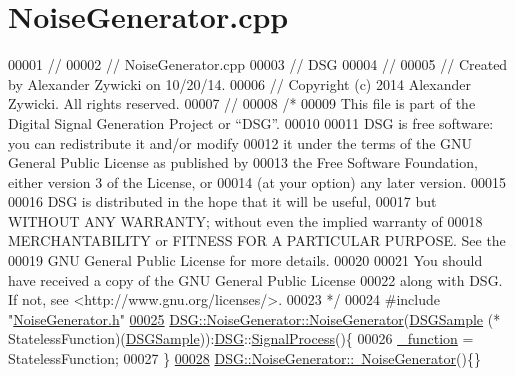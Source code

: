 \hypertarget{_noise_generator_8cpp_source}{\section{Noise\+Generator.\+cpp}
\label{_noise_generator_8cpp_source}
}

\begin{DoxyCode}
00001 \textcolor{comment}{//}
00002 \textcolor{comment}{//  NoiseGenerator.cpp}
00003 \textcolor{comment}{//  DSG}
00004 \textcolor{comment}{//}
00005 \textcolor{comment}{//  Created by Alexander Zywicki on 10/20/14.}
00006 \textcolor{comment}{//  Copyright (c) 2014 Alexander Zywicki. All rights reserved.}
00007 \textcolor{comment}{//}
00008 \textcolor{comment}{/*}
00009 \textcolor{comment}{ This file is part of the Digital Signal Generation Project or “DSG”.}
00010 \textcolor{comment}{}
00011 \textcolor{comment}{ DSG is free software: you can redistribute it and/or modify}
00012 \textcolor{comment}{ it under the terms of the GNU General Public License as published by}
00013 \textcolor{comment}{ the Free Software Foundation, either version 3 of the License, or}
00014 \textcolor{comment}{ (at your option) any later version.}
00015 \textcolor{comment}{}
00016 \textcolor{comment}{ DSG is distributed in the hope that it will be useful,}
00017 \textcolor{comment}{ but WITHOUT ANY WARRANTY; without even the implied warranty of}
00018 \textcolor{comment}{ MERCHANTABILITY or FITNESS FOR A PARTICULAR PURPOSE.  See the}
00019 \textcolor{comment}{ GNU General Public License for more details.}
00020 \textcolor{comment}{}
00021 \textcolor{comment}{ You should have received a copy of the GNU General Public License}
00022 \textcolor{comment}{ along with DSG.  If not, see <http://www.gnu.org/licenses/>.}
00023 \textcolor{comment}{ */}
00024 \textcolor{preprocessor}{#include "\hyperlink{_noise_generator_8h}{NoiseGenerator.h}"}
\hypertarget{_noise_generator_8cpp_source_l00025}{}\hyperlink{class_d_s_g_1_1_noise_generator_ac78b8347da0c0593d495d9d054821c34}{00025} \hyperlink{class_d_s_g_1_1_noise_generator_ac78b8347da0c0593d495d9d054821c34}{DSG::NoiseGenerator::NoiseGenerator}(\hyperlink{namespace_d_s_g_ac39a94cd27ebcd9c1e7502d0c624894a}{DSGSample} (*
      StatelessFunction)(\hyperlink{namespace_d_s_g_ac39a94cd27ebcd9c1e7502d0c624894a}{DSGSample})):\hyperlink{namespace_d_s_g}{DSG}::\hyperlink{class_d_s_g_1_1_signal_process}{SignalProcess}()\{
00026     \hyperlink{class_d_s_g_1_1_noise_generator_a3fe30476196e0bfa22e314ce9bbd368b}{\_function} = StatelessFunction;
00027 \}
\hypertarget{_noise_generator_8cpp_source_l00028}{}\hyperlink{class_d_s_g_1_1_noise_generator_a964f0af791b5e09e63470bf42ddbce79}{00028} \hyperlink{class_d_s_g_1_1_noise_generator_a964f0af791b5e09e63470bf42ddbce79}{DSG::NoiseGenerator::~NoiseGenerator}()\{\}
\end{DoxyCode}
